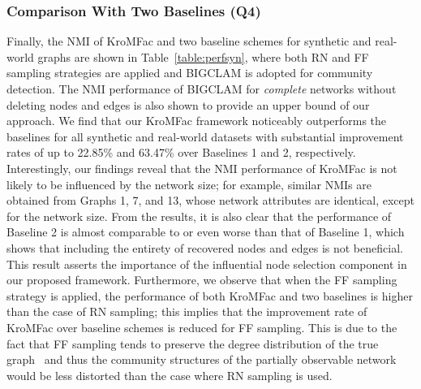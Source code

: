 \documentclass[format=acmsmall, review=false, screen=true]{acmart}
\begin{document}
\subsubsection{Comparison With Two Baselines (Q4)}
Finally, the NMI of \textsf{KroMFac} and two baseline schemes for synthetic and real-world graphs are shown in Table~\ref{table:perfsyn}, where both RN and FF sampling strategies are applied and BIGCLAM is adopted for community detection. The NMI performance of BIGCLAM for {\em complete} networks without deleting nodes and edges is also shown to provide an upper bound of our approach. We find that our \textsf{KroMFac} framework noticeably outperforms the baselines for all synthetic and real-world datasets with substantial improvement rates of up to 22.85\% and 63.47\% over Baselines 1 and 2, respectively. Interestingly, our findings reveal that the NMI performance of \textsf{KroMFac} is not likely to be influenced by the network size; for example, similar  NMIs are obtained from Graphs 1, 7, and 13, whose network attributes are identical, except for the network size.
From the results, it is also clear that the performance of Baseline 2 is almost comparable to or even worse than that of Baseline 1, which shows that including the entirety of recovered nodes and edges is not beneficial. This result asserts the importance of the influential node selection component in our proposed framework.  
Furthermore, we observe that when the FF sampling strategy is applied, the performance of both \textsf{KroMFac} and two baselines is higher than the case of RN sampling; this implies that the improvement rate of \textsf{KroMFac} over baseline schemes is reduced for FF sampling. This is due to the fact that FF sampling tends to preserve the degree distribution of the true graph~\cite{graphsampling} and thus the community structures of the partially observable network would be less distorted than the case where RN sampling is used.

\end{document}
